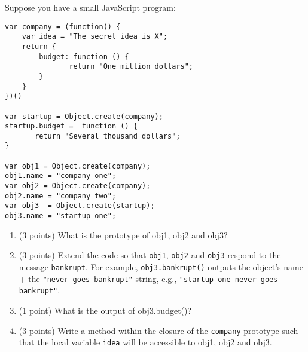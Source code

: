\noindent
Suppose you have a small JavaScript program:
\begin{verbatim}
var company = (function() {
    var idea = "The secret idea is X";
    return {
        budget: function () {
               return "One million dollars";
        }
    }
})()

var startup = Object.create(company);
startup.budget =  function () {
       return "Several thousand dollars";
}

var obj1 = Object.create(company);
obj1.name = "company one";
var obj2 = Object.create(company);
obj2.name = "company two";
var obj3  = Object.create(startup);
obj3.name = "startup one";
\end{verbatim}

\begin{enumerate}
\item (3 points) What is the prototype of obj1, obj2 and obj3?
\vspace{4cm}

\newpage

\item (3 points) Extend the code so that \texttt{obj1}, \texttt{obj2} and \texttt{obj3} respond to the message \texttt{bankrupt}. For example, \texttt{obj3.bankrupt()} outputs the object's name + the \texttt{"never goes bankrupt"} string, e.g., \texttt{"startup one never goes bankrupt"}.
\vspace{5cm}

\item (1 point) What is the output of obj3.budget()?
\vspace{4cm}

\item (3 points) Write a method within the closure of the \texttt{company} prototype such that the local variable \texttt{idea} will be accessible to obj1, obj2 and obj3.
\end{enumerate}

